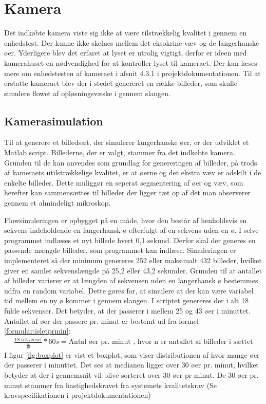 \newpage
\section{Kamera}
Det indkøbte kamera viste sig ikke at være tilstrækkelig kvalitet i gennem en enhedstest. Der kunne ikke skelnes mellem det eksokrine væv og de langerhanske øer. Yderligere blev det erfaret at lyset er utrolig vigtigt, derfor er ideen med kamerahuset en nødvendighed for at kontroller lyset til kameraet. Der kan læses mere om enhedstesten af kameraet i afsnit 4.3.1  i projektdokumentationen. Til at erstatte kameraet blev der i stedet genereret en række billeder, som skulle simulere flowet af opløsningsvæske i gennem slangen.

\subsection{Kamerasimulation}
Til at generere et billedsæt, der simulerer langerhanske øer, er der udviklet et Matlab script. Billederne, der er valgt, stammer fra det indkøbte kamera. Grunden til de kan anvendes som grundlag for genereringen af billeder, på trods af kameraets utilstrækkelige kvalitet, er at øerne og det ekstra væv er adskilt i de enkelte billeder. Dette muliggør en seperat segmentering af øer og væv, som  herefter kan sammensættes til billeder der ligger tæt op af det man observerer gennem et almindeligt mikroskop. 

Flowsimuleringen er opbygget på en måde, hvor den består af henholdsvis en sekvens indeholdende en langerhansk ø efterfulgt af en sekvens uden en ø. I selve programmet indlæses et nyt billede hvert 0,1 sekund. Derfor skal der generes en passende mængde billeder, som programmet kan indlæse. Simuleringen er implementeret så der minimum genereres 252 eller maksimalt 432 billeder, hvilket giver en samlet sekvenslængde på 25,2 eller 43,2 sekunder. Grunden til at antallet af billeder varierer er at længden af sekvensen uden en langerhansk ø bestemmes udfra en random variabel. Dette gøres for, at simulere at der kan være variabel tid mellem en ny ø kommer i gennem slangen. I scriptet genereres der i alt 18 fulde sekvenser. Det betyder, at der passerer i mellem 25 og 43 øer i minuttet. Antallet af øer der passere pr. minut er bestemt ud fra formel \ref{formular:isletprmin}: 
\begin{align}
\frac{18\text{ sekvenser}}{\frac{n}{10}} * 60s = \text{Antal øer pr. minut}
\text{ , hvor n er antallet af billeder i sættet}
\label{formular:isletprmin}
\end{align} 
I figur \ref{fig:boxplot} er vist et boxplot, som viser distributionen af hvor mange øer der passerer i minuttet. Det ses at medianen ligger over 30 øer pr. minut, hvilket betyder at der i gennemsnit vil blive sorteret over 30 øer pr minut. De 30 øer pr. minut stammer fra hastighedskravet fra systemets kvalitetskrav (Se kravspecifikationen i projektdokumentationen)

